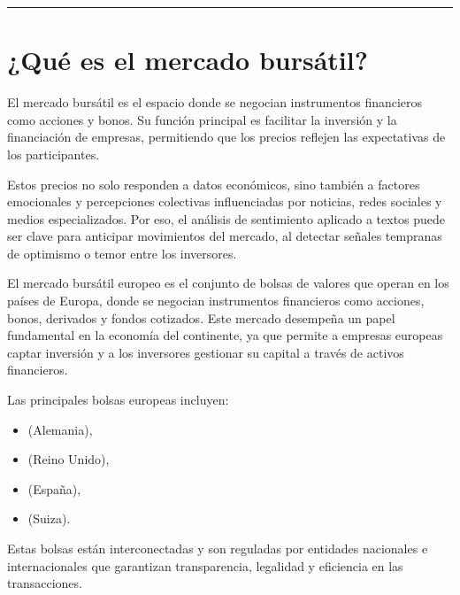 \documentclass[letterpaper,10pt,spanish]{sphinxmanual}
\begin{document}
\bigskip\hrule\bigskip



\section{¿Qué es el mercado bursátil?}
\label{\detokenize{DescripcionProblema:que-es-el-mercado-bursatil}}
\sphinxAtStartPar
El mercado bursátil es el espacio donde se negocian instrumentos financieros como acciones y bonos. Su función principal es facilitar la inversión y la financiación de empresas, permitiendo que los precios reflejen las expectativas de los participantes.

\sphinxAtStartPar
Estos precios no solo responden a datos económicos, sino también a factores emocionales y percepciones colectivas influenciadas por noticias, redes sociales y medios especializados. Por eso, el análisis de sentimiento aplicado a textos puede ser clave para anticipar movimientos del mercado, al detectar señales tempranas de optimismo o temor entre los inversores.

\sphinxAtStartPar
El mercado bursátil europeo es el conjunto de bolsas de valores que operan en los países de Europa, donde se negocian instrumentos financieros como acciones, bonos, derivados y fondos cotizados. Este mercado desempeña un papel fundamental en la economía del continente, ya que permite a empresas europeas captar inversión y a los inversores gestionar su capital a través de activos financieros.

\sphinxAtStartPar
Las principales bolsas europeas incluyen:
\begin{itemize}
\item {} 
\sphinxAtStartPar
{} (Alemania),

\item {} 
\sphinxAtStartPar
{} (Reino Unido),

\item {} 
\sphinxAtStartPar
{} (España),

\item {} 
\sphinxAtStartPar
{} (Suiza).

\end{itemize}

\sphinxAtStartPar
Estas bolsas están interconectadas y son reguladas por entidades nacionales e internacionales que garantizan transparencia, legalidad y eficiencia en las transacciones.
\end{document}
